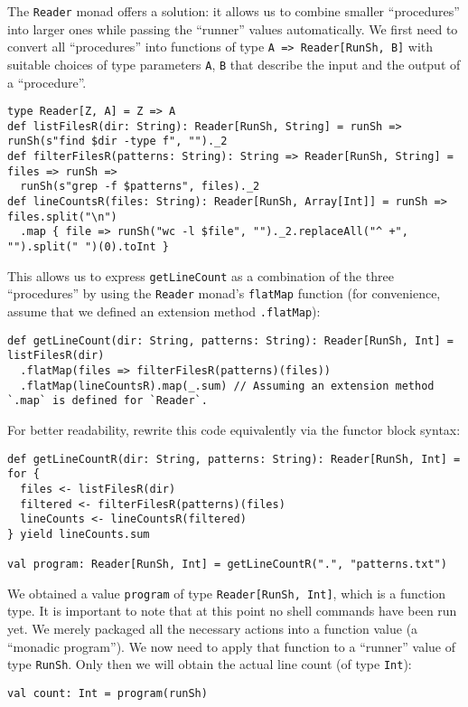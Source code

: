 The \lstinline!Reader! monad offers a solution: it allows us to combine
smaller \textsf{``}procedures\textsf{''} into larger ones while passing the \textsf{``}runner\textsf{''}
values automatically. We first need to convert all \textsf{``}procedures\textsf{''}
into functions of type \lstinline!A => Reader[RunSh, B]! with suitable
choices of type parameters \lstinline!A!, \lstinline!B! that describe
the input and the output of a \textsf{``}procedure\textsf{''}.
\begin{lstlisting}
type Reader[Z, A] = Z => A
def listFilesR(dir: String): Reader[RunSh, String] = runSh => runSh(s"find $dir -type f", "")._2
def filterFilesR(patterns: String): String => Reader[RunSh, String] = files => runSh =>
  runSh(s"grep -f $patterns", files)._2
def lineCountsR(files: String): Reader[RunSh, Array[Int]] = runSh => files.split("\n")
  .map { file => runSh("wc -l $file", "")._2.replaceAll("^ +", "").split(" ")(0).toInt }
\end{lstlisting}
 This allows us to express \lstinline!getLineCount! as a combination
of the three \textsf{``}procedures\textsf{''} by using the \lstinline!Reader! monad\textsf{'}s
\lstinline!flatMap! function (for convenience, assume that we defined
an extension method \lstinline!.flatMap!):
\begin{lstlisting}
def getLineCount(dir: String, patterns: String): Reader[RunSh, Int] = listFilesR(dir)
  .flatMap(files => filterFilesR(patterns)(files))
  .flatMap(lineCountsR).map(_.sum) // Assuming an extension method `.map` is defined for `Reader`.
\end{lstlisting}
For better readability, rewrite this code equivalently via the functor
block syntax:
\begin{lstlisting}
def getLineCountR(dir: String, patterns: String): Reader[RunSh, Int] = for {
  files <- listFilesR(dir)
  filtered <- filterFilesR(patterns)(files)
  lineCounts <- lineCountsR(filtered)
} yield lineCounts.sum

val program: Reader[RunSh, Int] = getLineCountR(".", "patterns.txt") 
\end{lstlisting}
We obtained a value \lstinline!program! of type \lstinline!Reader[RunSh, Int]!,
which is a function type. It is important to note that at this point
no shell commands have been run yet. We merely packaged all the necessary
actions into a function value (a \textsf{``}monadic program\textsf{''}). We now need
to apply that function to a \textsf{``}runner\textsf{''} value of type \lstinline!RunSh!.
Only then we will obtain the actual line count (of type \lstinline!Int!):
\begin{lstlisting}
val count: Int = program(runSh)
\end{lstlisting}

